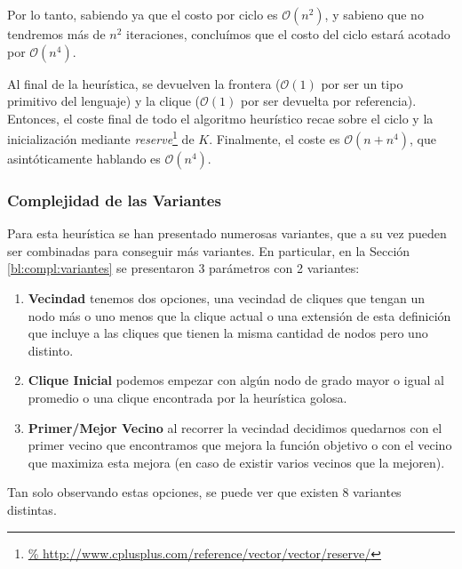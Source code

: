 \par Por lo tanto, sabiendo ya que el costo por ciclo es
    $\mathcal O(n^2)$, y sabieno que no tendremos m\'as
    de $n^2$ iteraciones, conclu\'imos que el costo del
    ciclo estar\'a acotado por $\mathcal O(n^4)$.

\par Al final de la heur\'istica, se devuelven la frontera
    ($\mathcal O(1)$ por ser un tipo primitivo del lenguaje)
    y la clique ($\mathcal O(1)$ por ser devuelta por
    referencia). Entonces, el coste final de todo el algoritmo
    heur\'istico recae sobre el ciclo y la inicializaci\'on
    mediante \emph{reserve}\footnote{\url{%
    http://www.cplusplus.com/reference/vector/vector/reserve/}} de
    $K$. Finalmente, el coste es $\mathcal O(n + n^4)$, que
    asint\'oticamente hablando es $\mathcal O(n^4)$.

\subsubsection{Complejidad de las Variantes\label{bl:compl:variantes}}
\par Para esta heur\'istica se han presentado numerosas variantes, que
    a su vez pueden ser combinadas para conseguir m\'as variantes. En
    particular, en la Secci\'on \ref{bl:compl:variantes} se presentaron
    3 par\'ametros con 2 variantes:

\begin{enumerate}
    \item \textbf{Vecindad} tenemos dos opciones, una vecindad de cliques
        que tengan un nodo m\'as o uno menos que la clique actual o
        una extensi\'on de esta definici\'on que incluye a las cliques
        que tienen la misma cantidad de nodos pero uno distinto.

    \item \textbf{Clique Inicial} podemos empezar con alg\'un nodo
        de grado mayor o igual al promedio o una clique encontrada
        por la heur\'istica golosa.

    \item \textbf{Primer/Mejor Vecino} al recorrer la vecindad decidimos
        quedarnos con el primer vecino que encontramos que mejora
        la funci\'on objetivo o con el vecino que maximiza esta mejora
        (en caso de existir varios vecinos que la mejoren).
\end{enumerate}

\bigskip

\par Tan solo observando estas opciones, se puede ver que existen 8
    variantes distintas.

